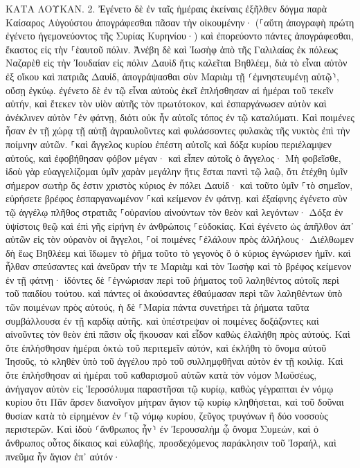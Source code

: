 \documentclass[twoside, 9pt]{extreport}
\begin{document}
ΚΑΤΑ ΛΟΥΚΑΝ.
2.
Ἐγένετο δὲ ἐν ταῖς ἡμέραις ἐκείναις ἐξῆλθεν δόγμα παρὰ Καίσαρος Αὐγούστου ἀπογράφεσθαι πᾶσαν τὴν οἰκουμένην· 
(⸀αὕτη ἀπογραφὴ πρώτη ἐγένετο ἡγεμονεύοντος τῆς Συρίας Κυρηνίου·) 
καὶ ἐπορεύοντο πάντες ἀπογράφεσθαι, ἕκαστος εἰς τὴν ⸀ἑαυτοῦ πόλιν. 
Ἀνέβη δὲ καὶ Ἰωσὴφ ἀπὸ τῆς Γαλιλαίας ἐκ πόλεως Ναζαρὲθ εἰς τὴν Ἰουδαίαν εἰς πόλιν Δαυὶδ ἥτις καλεῖται Βηθλέεμ, διὰ τὸ εἶναι αὐτὸν ἐξ οἴκου καὶ πατριᾶς Δαυίδ, 
ἀπογράψασθαι σὺν Μαριὰμ τῇ ⸂ἐμνηστευμένῃ αὐτῷ⸃, οὔσῃ ἐγκύῳ. 
ἐγένετο δὲ ἐν τῷ εἶναι αὐτοὺς ἐκεῖ ἐπλήσθησαν αἱ ἡμέραι τοῦ τεκεῖν αὐτήν, 
καὶ ἔτεκεν τὸν υἱὸν αὐτῆς τὸν πρωτότοκον, καὶ ἐσπαργάνωσεν αὐτὸν καὶ ἀνέκλινεν αὐτὸν ⸀ἐν φάτνῃ, διότι οὐκ ἦν αὐτοῖς τόπος ἐν τῷ καταλύματι. 
Καὶ ποιμένες ἦσαν ἐν τῇ χώρᾳ τῇ αὐτῇ ἀγραυλοῦντες καὶ φυλάσσοντες φυλακὰς τῆς νυκτὸς ἐπὶ τὴν ποίμνην αὐτῶν. 
⸀καὶ ἄγγελος κυρίου ἐπέστη αὐτοῖς καὶ δόξα κυρίου περιέλαμψεν αὐτούς, καὶ ἐφοβήθησαν φόβον μέγαν· 
καὶ εἶπεν αὐτοῖς ὁ ἄγγελος· Μὴ φοβεῖσθε, ἰδοὺ γὰρ εὐαγγελίζομαι ὑμῖν χαρὰν μεγάλην ἥτις ἔσται παντὶ τῷ λαῷ, 
ὅτι ἐτέχθη ὑμῖν σήμερον σωτὴρ ὅς ἐστιν χριστὸς κύριος ἐν πόλει Δαυίδ· 
καὶ τοῦτο ὑμῖν ⸀τὸ σημεῖον, εὑρήσετε βρέφος ἐσπαργανωμένον ⸀καὶ κείμενον ἐν φάτνῃ. 
καὶ ἐξαίφνης ἐγένετο σὺν τῷ ἀγγέλῳ πλῆθος στρατιᾶς ⸀οὐρανίου αἰνούντων τὸν θεὸν καὶ λεγόντων· 
Δόξα ἐν ὑψίστοις θεῷ καὶ ἐπὶ γῆς εἰρήνη ἐν ἀνθρώποις ⸀εὐδοκίας. 
Καὶ ἐγένετο ὡς ἀπῆλθον ἀπ᾽ αὐτῶν εἰς τὸν οὐρανὸν οἱ ἄγγελοι, ⸀οἱ ποιμένες ⸀ἐλάλουν πρὸς ἀλλήλους· Διέλθωμεν δὴ ἕως Βηθλέεμ καὶ ἴδωμεν τὸ ῥῆμα τοῦτο τὸ γεγονὸς ὃ ὁ κύριος ἐγνώρισεν ἡμῖν. 
καὶ ἦλθαν σπεύσαντες καὶ ἀνεῦραν τήν τε Μαριὰμ καὶ τὸν Ἰωσὴφ καὶ τὸ βρέφος κείμενον ἐν τῇ φάτνῃ· 
ἰδόντες δὲ ⸀ἐγνώρισαν περὶ τοῦ ῥήματος τοῦ λαληθέντος αὐτοῖς περὶ τοῦ παιδίου τούτου. 
καὶ πάντες οἱ ἀκούσαντες ἐθαύμασαν περὶ τῶν λαληθέντων ὑπὸ τῶν ποιμένων πρὸς αὐτούς, 
ἡ δὲ ⸀Μαρία πάντα συνετήρει τὰ ῥήματα ταῦτα συμβάλλουσα ἐν τῇ καρδίᾳ αὐτῆς. 
καὶ ὑπέστρεψαν οἱ ποιμένες δοξάζοντες καὶ αἰνοῦντες τὸν θεὸν ἐπὶ πᾶσιν οἷς ἤκουσαν καὶ εἶδον καθὼς ἐλαλήθη πρὸς αὐτούς. 
Καὶ ὅτε ἐπλήσθησαν ἡμέραι ὀκτὼ τοῦ περιτεμεῖν αὐτόν, καὶ ἐκλήθη τὸ ὄνομα αὐτοῦ Ἰησοῦς, τὸ κληθὲν ὑπὸ τοῦ ἀγγέλου πρὸ τοῦ συλλημφθῆναι αὐτὸν ἐν τῇ κοιλίᾳ. 
Καὶ ὅτε ἐπλήσθησαν αἱ ἡμέραι τοῦ καθαρισμοῦ αὐτῶν κατὰ τὸν νόμον Μωϋσέως, ἀνήγαγον αὐτὸν εἰς Ἱεροσόλυμα παραστῆσαι τῷ κυρίῳ, 
καθὼς γέγραπται ἐν νόμῳ κυρίου ὅτι Πᾶν ἄρσεν διανοῖγον μήτραν ἅγιον τῷ κυρίῳ κληθήσεται, 
καὶ τοῦ δοῦναι θυσίαν κατὰ τὸ εἰρημένον ἐν ⸀τῷ νόμῳ κυρίου, ζεῦγος τρυγόνων ἢ δύο νοσσοὺς περιστερῶν. 
Καὶ ἰδοὺ ⸂ἄνθρωπος ἦν⸃ ἐν Ἰερουσαλὴμ ᾧ ὄνομα Συμεών, καὶ ὁ ἄνθρωπος οὗτος δίκαιος καὶ εὐλαβής, προσδεχόμενος παράκλησιν τοῦ Ἰσραήλ, καὶ πνεῦμα ἦν ἅγιον ἐπ᾽ αὐτόν· 
\end{document}
